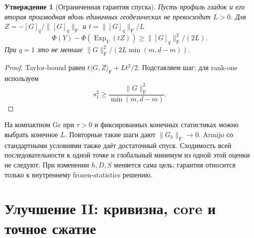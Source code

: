 \documentclass[11pt,a4paper]{article}
\newcommand{\F}{_{\mathrm F}}
\newcommand{\ip}[2]{\langle #1,#2\rangle_{\mathrm F}}
\newcommand{\Gr}{\mathrm{Gr}}
\newcommand{\Exp}{\operatorname{Exp}}
\newtheorem{proposition}{Утверждение}[section]
\begin{document}
\begin{proposition}[Ограниченная гарантия спуска]\label{prop:descent}
Пусть профиль гладок и его вторая производная вдоль единичных
геодезических не превосходит $L>0$. Для
$Z=-[G]_q/\|[G]_q\|\F$ и $t=\|[G]_q\|\F/L$
\[
 \Phi(Y)-\Phi(\Exp_Y(tZ))\ge\|[G]_q\|\F^2/(2L).
\]
При $q=1$ это не меньше $\|G\|\F^2/(2L\min(m,d-m))$.
\end{proposition}
\begin{proof}
Taylor-bound равен $t\ip{G}{Z}+Lt^2/2$. Подставляем шаг;
для rank-one используем
\[
 s_1^2\ge\frac{\|G\|\F^2}{\min(m,d-m)}.
\]
\end{proof}
На компактном $\Gr$ при $\tau>0$ и фиксированных конечных статистиках
можно выбрать конечное $L$. Повторные такие шаги дают $\|G_k\|\F\to0$.
Armijo со стандартными условиями также даёт достаточный спуск.
Сходимость всей последовательности к одной точке и глобальный минимум
из одной этой оценки не следуют. При изменении $h,D,S$ меняется сама цель;
гарантия относится только к внутреннему frozen-statistics решению.

\section{Улучшение II: кривизна, core и точное сжатие}\label{sec:reduced}
\end{document}
